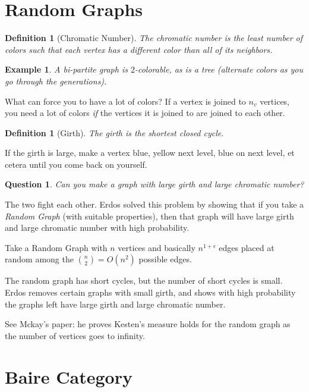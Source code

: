 \documentclass[12pt,letterpaper]{report}
\newtheorem{exa}[thm]{Example}
\newtheorem{defi}[thm]{Definition}
\newtheorem{que}[thm]{Question}
\newcommand{\ncr}[2]{{#1 \choose #2}}
\begin{document}
\section{Random Graphs}

\begin{defi}[Chromatic Number] The chromatic number is the
least number of colors such that each vertex has a different color
than all of its neighbors.
\end{defi}

\begin{exa} A bi-partite graph is $2$-colorable, as is a tree
(alternate colors as  you go through the generations).
\end{exa}

What can force you to have a lot of colors? If a vertex is joined
to $n_v$ vertices, you need a lot of colors \emph{if} the vertices
it is joined to are joined to each other.

\begin{defi}[Girth] The girth is the shortest closed cycle.
\end{defi}

If the girth is large, make a vertex blue, yellow next level, blue
on next level, et cetera until you come back on yourself.

\begin{que} Can you make a graph with large girth and large
chromatic number?
\end{que}

The two fight each other. Erdos solved this problem by showing
that if you take a \emph{Random Graph} (with suitable properties),
then that graph will have large girth and large chromatic number
with high probability.

Take a Random Graph with $n$ vertices and basically $n^{1 +
\epsilon}$ edges placed at random among the $\ncr{n}{2} = O(n^2)$
possible edges.

The random graph has short cycles, but the number of short cycles
is small. Erdos removes certain graphs with small girth, and shows
with high probability the graphs left have large girth and large
chromatic number.

See Mckay's paper: he proves Kesten's measure holds for the random
graph as the number of vertices goes to infinity.


\section{Baire Category}
\end{document}
